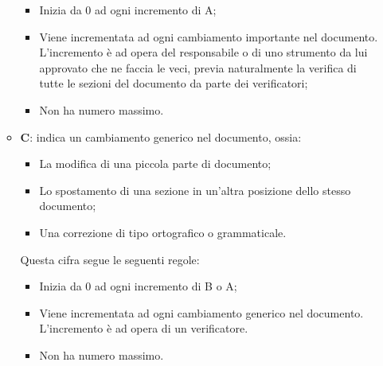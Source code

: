 \documentclass[../norme-di-progetto.tex]{subfiles}
\begin{document}
\begin{itemize}
\begin{itemize}
    \begin{itemize}
      \item Inizia da 0 ad ogni incremento di A;
      \item Viene incrementata ad ogni cambiamento importante nel documento. L'incremento è ad opera del responsabile o di uno strumento da lui approvato che ne faccia le veci, previa naturalmente la verifica di tutte le sezioni del documento da parte dei verificatori;
      \item Non ha numero massimo.
    \end{itemize}
    \item \textbf{C}: indica un cambiamento generico nel documento, ossia:
    \begin{itemize}
      \item La modifica di una piccola parte di documento;
      \item Lo spostamento di una sezione in un'altra posizione dello stesso documento;
      \item Una correzione di tipo ortografico o grammaticale.
    \end{itemize}
    Questa cifra segue le seguenti regole:
    \begin{itemize}
      \item Inizia da 0 ad ogni incremento di B o A;
      \item Viene incrementata ad ogni cambiamento generico nel documento. L'incremento è ad opera di un verificatore.
      \item Non ha numero massimo.
    \end{itemize}
  \end{itemize}
\end{itemize}
\end{document}
